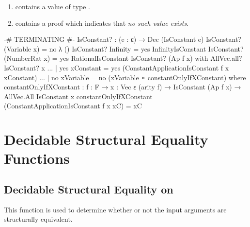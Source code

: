 \documentclass{report}
\begin{document}
\begin{enumerate}
  \item {}  contains a value of type  .
  \item {}  contains a proof which indicates that \emph{no such value exists}.
\end{enumerate}

\begin{code}
  {-# TERMINATING #-}
  IsConstant? : (e : ε) → Dec (IsConstant e)
  IsConstant? (Variable x) = no λ ()
  IsConstant? Infinity = yes InfinityIsConstant
  IsConstant? (NumberRat x) = yes RationalIsConstant
  IsConstant? (Ap f x) with AllVec.all? IsConstant? x
  ... | yes xConstant = yes (ConstantApplicationIsConstant f x xConstant)
  ... | no xVariable = no (xVariable ∘ constantOnlyIfXConstant)
    where
    constantOnlyIfXConstant :
      {f : F} →
      {x : Vec ε (arity f)} →
      IsConstant (Ap f x) →
      AllVec.All IsConstant x
    constantOnlyIfXConstant (ConstantApplicationIsConstant f x xC) = xC
\end{code}

\chapter{Decidable Structural Equality Functions}

\section{Decidable Structural Equality on }
This function is used to determine whether or not the input arguments are structurally equivalent.
\end{document}
